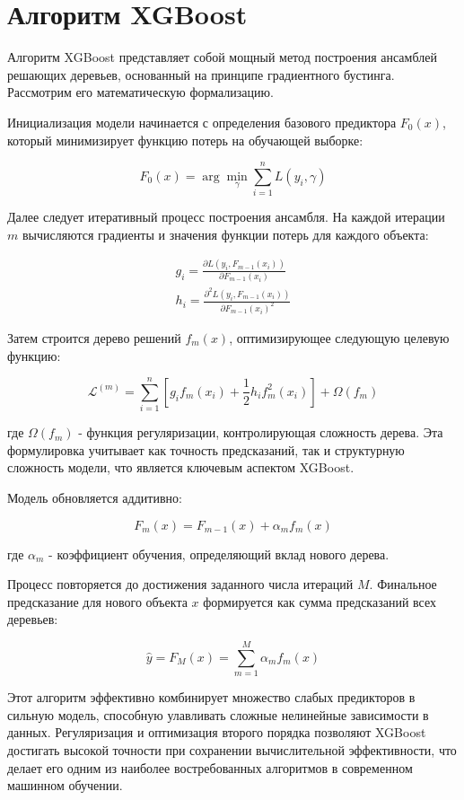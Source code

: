 \section{Алгоритм XGBoost}

Алгоритм XGBoost представляет собой мощный метод построения ансамблей решающих
деревьев, основанный на принципе градиентного бустинга. Рассмотрим его
математическую формализацию.

Инициализация модели начинается с определения базового предиктора $F_0(x)$,
который минимизирует функцию потерь на обучающей выборке:

\[F_0(x) = \arg \min_{\gamma} \sum_{i=1}^n L(y_i, \gamma)\]

Далее следует итеративный процесс построения ансамбля. На каждой итерации $m$
вычисляются градиенты и значения функции потерь для каждого объекта:

\begin{gather*}
	g_i = \frac{\partial L(y_i, F_{m-1}(x_i))}{\partial F_{m-1}(x_i)}\\
	h_i = \frac{\partial^2 L(y_i, F_{m-1}(x_i))}{\partial F_{m-1}(x_i)^2}
\end{gather*}

Затем строится дерево решений $f_m(x)$, оптимизирующее следующую целевую функцию:

\[\mathcal{L}^{(m)} = \sum_{i=1}^n \left[ g_i f_m(x_i) + \frac{1}{2} h_i f_m^2(x_i) \right] + \Omega(f_m)\]

где $\Omega(f_m)$ - функция регуляризации, контролирующая сложность дерева. Эта
формулировка учитывает как точность предсказаний, так и структурную сложность
модели, что является ключевым аспектом XGBoost.

Модель обновляется аддитивно:

\[F_m(x) = F_{m-1}(x) + \alpha_m f_m(x)\]

где $\alpha_m$ - коэффициент обучения, определяющий вклад нового дерева.

Процесс повторяется до достижения заданного числа итераций $M$. Финальное
предсказание для нового объекта $x$ формируется как сумма предсказаний всех
деревьев:

\[\hat{y} = F_M(x) = \sum_{m=1}^M \alpha_m f_m(x)\]

Этот алгоритм эффективно комбинирует множество слабых предикторов в сильную
модель, способную улавливать сложные нелинейные зависимости в данных.
Регуляризация и оптимизация второго порядка позволяют XGBoost достигать высокой
точности при сохранении вычислительной эффективности, что делает его одним из
наиболее востребованных алгоритмов в современном машинном обучении.

